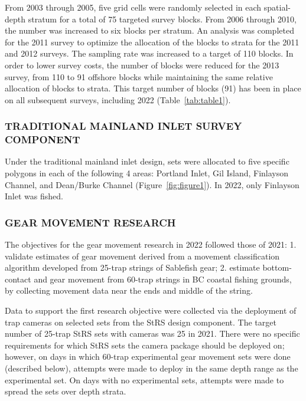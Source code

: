 \documentclass[12pt]{article}\usepackage[]{graphicx}\usepackage[]{color}
\begin{document}
From 2003 through 2005, five grid cells were randomly selected in each spatial-depth stratum for a total of 75 targeted survey blocks. From 2006 through 2010, the number was increased to six blocks per stratum. An analysis was completed for the 2011 survey to optimize the allocation of the blocks to strata for the 2011 and 2012 surveys. The sampling rate was increased to a target of 110 blocks. In order to lower survey costs, the number of blocks were reduced for the 2013 survey, from 110 to 91 offshore blocks while maintaining the same relative allocation of blocks to strata. This target number of blocks (91) has been in place on all subsequent surveys, including 2022 (Table~\ref{tab:table1}).

\hypertarget{trad}{%
\subsubsection{TRADITIONAL MAINLAND INLET SURVEY COMPONENT}\label{trad}}

Under the traditional mainland inlet design, sets were allocated to five specific polygons in each of the following 4 areas: Portland Inlet, Gil Island, Finlayson Channel, and Dean/Burke Channel (Figure~\ref{fig:figure1}). In 2022, only Finlayson Inlet was fished.

\hypertarget{gear}{%
\subsubsection{GEAR MOVEMENT RESEARCH}\label{gear}}

The objectives for the gear movement research in 2022 followed those of 2021: 1. validate estimates of gear movement derived from a movement classification algorithm developed from 25-trap strings of Sablefish gear; 2. estimate bottom-contact and gear movement from 60-trap strings in BC coastal fishing grounds, by collecting movement data near the ends and middle of the string.

Data to support the first research objective were collected via the deployment of trap cameras on selected sets from the StRS design component. The target number of 25-trap StRS sets with cameras was 25 in 2021. There were no specific requirements for which StRS sets the camera package should be deployed on; however, on days in which 60-trap experimental gear movement sets were done (described below), attempts were made to deploy in the same depth range as the experimental set. On days with no experimental sets, attempts were made to spread the sets over depth strata.
\end{document}
